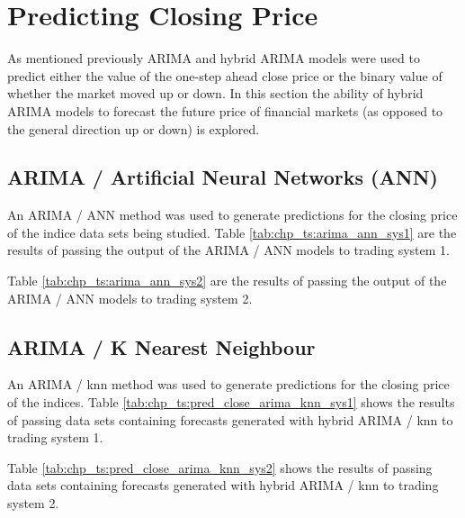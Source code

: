 \section{Predicting Closing Price}
As mentioned previously ARIMA and hybrid ARIMA models were used to predict either the value of the one-step ahead close price or the binary value of whether the market moved up or down. In this section the ability of hybrid ARIMA models to forecast the future price of financial markets (as opposed to the general direction up or down) is explored.

\subsection{ARIMA / Artificial Neural Networks (ANN)}
An ARIMA / ANN method was used to generate predictions for the closing price of the indice data sets being studied. Table \ref{tab:chp_ts:arima_ann_sys1} are the results of passing the output of the ARIMA / ANN models to trading system 1.



Table \ref{tab:chp_ts:arima_ann_sys2} are the results of passing the output of the ARIMA / ANN models to trading system 2.



\subsection{ARIMA / K Nearest Neighbour}
An ARIMA / knn method was used to generate predictions for the closing price of the indices. Table \ref{tab:chp_ts:pred_close_arima_knn_sys1} shows the results of passing data sets containing forecasts generated with hybrid ARIMA / knn to trading system 1.



 Table \ref{tab:chp_ts:pred_close_arima_knn_sys2} shows the results of passing data sets containing forecasts generated with hybrid ARIMA / knn to trading system 2.
 



